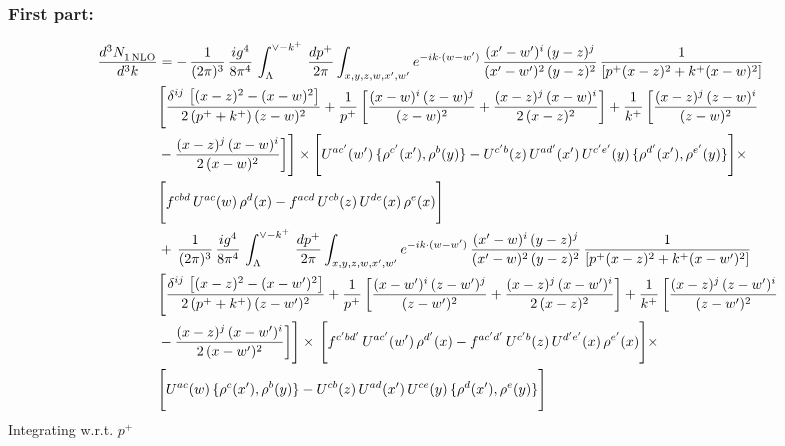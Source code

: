 \documentclass[9pt]{article}
\numberwithin{equation}{section}
\begin{document}
\subsubsection{First part:\,}
\begin{align}
    \frac{d^{3}N_{1\,\rm NLO}^{\rm}}{d^{3}k}  & = -\,\frac{1}{(2\pi)^{3}}\, \frac{ig^{4}}{8\pi^{4}}\, \int_{\Lambda}^{\vee-k^{+}}\, \frac{dp^{+}}{2\pi}\int_{x,y,z,w,x',w^{\prime}} e^{-ik\cdot (w-w')}\, \frac{(x'-w')^{i}\,(y-z)^{j}}{(x'-w')^{2}\,(y-z)^{2}}\,\frac{1}{\left[p^{+}(x-z)^{2}+k^{+}(x-w)^{2}\right]} \notag \\ & \Bigg[\frac{\delta^{ij}\, \left[(x-z)^{2}-(x-w)^{2}\right]}{2\, (p^{+}+k^{+})\,(z-w)^{2}}+\frac{1}{p^{+}}\, \bigg[\frac{(x-w)^{i}\,(z-w)^{j}}{(z-w)^{2}}+\frac{(x-z)^{j}\,(x-w)^{i}}{2\,(x-z)^{2}}\bigg]+\frac{1}{k^{+}}\,\bigg[\frac{(x-z)^{j}\,(z-w)^{i}}{(z-w)^{2}}\notag \\ & -\frac{(x-z)^{j}\,(x-w)^{i}}{2\,(x-w)^{2}}\bigg]\Bigg]\times \Bigg[U^{ac'}(w')\,\{\rho^{c'}(x'),\rho^{b}(y)\}-U^{c'b}(z)\,U^{ad'}(x')\,U^{c'e'}(y)\, \{\rho^{d'}(x'),\rho^{e'}(y)\}\Bigg]\times \notag \\ & \Bigg[f^{cbd}\,U^{ac}(w)\,\rho^{d}(x)-f^{acd}\, U^{cb}(z)\,U^{de}(x)\,\rho^{e}(x)\Bigg]\notag \\ & +\,\frac{1}{(2\pi)^{3}}\, \frac{ig^{4}}{8\pi^{4}}\, \int_{\Lambda}^{\vee-k^{+}}\,\frac{dp^{+}}{2\pi}\int_{x,y,z,w,x',w^{\prime}} e^{-ik\cdot (w-w')}\, \frac{(x'-w)^{i}\,(y-z)^{j}}{(x'-w)^{2}\,(y-z)^{2}}\,\frac{1}{\left[p^{+}(x-z)^{2}+k^{+}(x-w')^{2}\right]} \notag \\ & \Bigg[\frac{\delta^{ij}\, \left[(x-z)^{2}-(x-w')^{2}\right]}{2\, (p^{+}+k^{+})\,(z-w')^{2}}+\frac{1}{p^{+}}\, \bigg[\frac{(x-w')^{i}\,(z-w')^{j}}{(z-w')^{2}}+\frac{(x-z)^{j}\,(x-w')^{i}}{2\,(x-z)^{2}}\bigg]+\frac{1}{k^{+}}\,\bigg[\frac{(x-z)^{j}\,(z-w')^{i}}{(z-w')^{2}}\notag \\ & -\frac{(x-z)^{j}\,(x-w')^{i}}{2\,(x-w')^{2}}\bigg]\Bigg]\times\,\Bigg[f^{c'bd'}\,U^{ac'}(w')\,\rho^{d'}(x)-f^{ac'd'}\, U^{c'b}(z)\,U^{d'e'}(x)\,\rho^{e'}(x)\Bigg] \times \notag \\ & \Bigg[U^{ac}(w)\,\{\rho^{c}(x'),\rho^{b}(y)\}-U^{cb}(z)\,U^{ad}(x')\,U^{ce}(y)\, \{\rho^{d}(x'),\rho^{e}(y)\}\Bigg]
\end{align}
Integrating w.r.t. $p^{+}$ 
\end{document}
